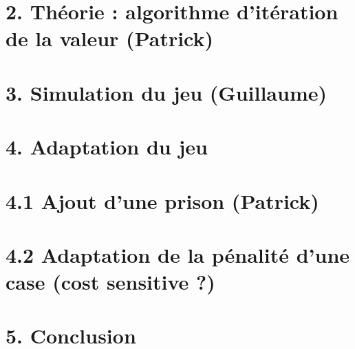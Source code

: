 \documentclass[french,]{article}
\begin{document}
\section{2. Théorie : algorithme d'itération de la valeur
(Patrick)}\label{theorie-algorithme-diteration-de-la-valeur-patrick}

\section{3. Simulation du jeu
(Guillaume)}\label{simulation-du-jeu-guillaume}

\section{4. Adaptation du jeu}\label{adaptation-du-jeu}

\section{4.1 Ajout d'une prison
(Patrick)}\label{ajout-dune-prison-patrick}

\section{4.2 Adaptation de la pénalité d'une case (cost sensitive
?)}\label{adaptation-de-la-penalite-dune-case-cost-sensitive}

\section{5. Conclusion}\label{conclusion}
\end{document}
